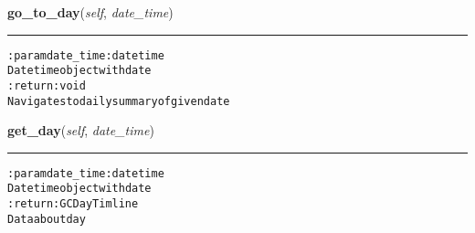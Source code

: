 \hspace{.8\funcindent}\begin{boxedminipage}{\funcwidth}

    \raggedright \textbf{go\_to\_day}(\textit{self}, \textit{date\_time})

    \vspace{-1.5ex}

    \rule{\textwidth}{0.5\fboxrule}
\setlength{\parskip}{2ex}
\begin{alltt}

:param date\_time: datetime
    Datetime object with date
:return: void
    Navigates to daily summary of given date
\end{alltt}

\setlength{\parskip}{1ex}
    \end{boxedminipage}

    \label{pygce:models:bot:GarminConnectBot:get_day}

    \vspace{0.5ex}

\hspace{.8\funcindent}\begin{boxedminipage}{\funcwidth}

    \raggedright \textbf{get\_day}(\textit{self}, \textit{date\_time})

    \vspace{-1.5ex}

    \rule{\textwidth}{0.5\fboxrule}
\setlength{\parskip}{2ex}
\begin{alltt}

:param date\_time: datetime
    Datetime object with date
:return: GCDayTimline
    Data about day
\end{alltt}

\setlength{\parskip}{1ex}
    \end{boxedminipage}

    \label{pygce:models:bot:GarminConnectBot:get_days}

    \vspace{0.5ex}


